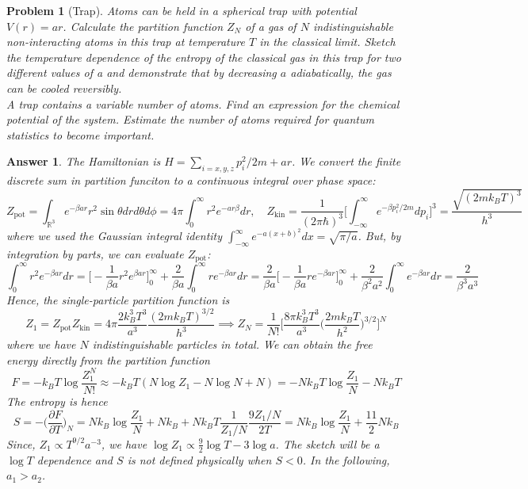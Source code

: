 \documentclass[a4paper]{article}
\newtheorem{ans}{Answer}[section]
\theoremstyle{new}
\newtheorem{qns}{Problem}[section]
\begin{document}
\begin{qns}[Trap]
Atoms can be held in a spherical trap with potential $V (r) = ar$. Calculate the partition function $Z_N$ of a gas of $N$ indistinguishable non-interacting atoms in this trap at temperature $T$ in the classical limit. Sketch the temperature dependence of the entropy of the classical gas in this trap for two different values of a and demonstrate that by decreasing $a$ adiabatically, the gas can be cooled reversibly. \\[5pt]
A trap contains a variable number of atoms. Find an expression for the chemical potential of the system. Estimate the number of atoms required for quantum statistics to become important.
\end{qns}
\begin{ans}
The Hamiltonian is $H=\sum_{i=x,y,z}p_i^2/2m+ar$. We convert the finite discrete sum in partition funciton to a continuous integral over phase space:
$$Z_{\text{pot}}=\int_{\mathbb{R}^3}e^{-\beta ar}r^2\sin\theta drd\theta d\phi=4\pi\int_0^\infty r^2e^{-ar\beta}dr,\quad Z_{\text{kin}}=\frac{1}{(2\pi\hbar)^3}\bigg[\int_{-\infty}^\infty e^{-\beta p_i^2/2m}dp_i\bigg]^3=\frac{\sqrt{(2mk_BT)^3}}{h^3}$$
where we used the Gaussian integral identity $\int_{-\infty}^\infty e^{-a(x+b)^2}dx=\sqrt{\pi/a}$. But, by integration by parts, we can evaluate $Z_{\text{pot}}$:
$$\int_0^\infty r^2e^{-\beta ar}dr=\bigg[-\frac{1}{\beta a}r^2e^{\beta ar}\bigg]_0^\infty+\frac{2}{\beta a}\int_0^\infty re^{-\beta ar}dr=\frac{2}{\beta a}\bigg[-\frac{1}{\beta a}re^{-\beta ar}\bigg]_0^\infty+\frac{2}{\beta^2a^2}\int_0^\infty e^{-\beta ar}dr=\frac{2}{\beta^3a^3}$$
Hence, the single-particle partition function is
$$Z_1=Z_{\text{pot}}Z_{\text{kin}}=4\pi\frac{2k_B^3T^3}{a^3}\frac{(2mk_BT)^{3/2}}{h^3}\implies Z_N=\frac{1}{N!}\bigg[\frac{8\pi k_B^3T^3}{a^3}\bigg(\frac{2mk_BT}{h^2}\bigg)^{3/2}\bigg]^N$$
where we have $N$ indistinguishable particles in total. We can obtain the free energy directly from the partition function
$$F=-k_BT\log\frac{Z_1^N}{N!}\approx -k_BT(N\log Z_1-N\log N+N)=-Nk_BT\log\frac{Z_1}{N}-Nk_BT$$
The entropy is hence
$$S=-\bigg(\frac{\partial F}{\partial T}\bigg)_N=Nk_B\log\frac{Z_1}{N}+Nk_B+Nk_BT\frac{1}{Z_1/N}\frac{9Z_1/N}{2T}=Nk_B\log\frac{Z_1}{N}+\frac{11}{2}Nk_B$$
Since, $Z_1\propto T^{9/2}a^{-3}$, we have $\log Z_1\propto\frac{9}{2}\log T-3\log a$. The sketch will be a $\log T$ dependence and $S$ is not defined physically when $S<0$. In the following, $a_1>a_2$.
\begin{center}
\begin{tikzpicture}

\end{tikzpicture}
\end{center}
\end{ans}
\end{document}

